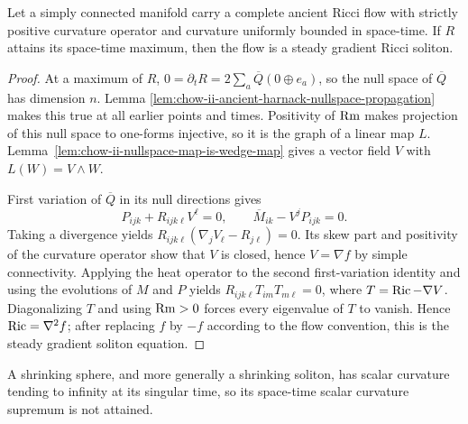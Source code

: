 \begin{theorem}
\label{thm:chow-ii-ancient-positive-curvature-maximizer-steady-soliton}


Let a simply connected manifold carry a complete ancient Ricci flow with
strictly positive curvature operator and curvature uniformly bounded in
space-time.  If \(R\) attains its space-time maximum, then the flow is a
steady gradient Ricci soliton.
\end{theorem}
\begin{proof}
\sketch At a maximum of \(R\),
\(0=\partial_tR=2\sum_a\overline Q(0\oplus e_a)\), so the null space of
\(\overline Q\) has dimension \(n\).  Lemma
\ref{lem:chow-ii-ancient-harnack-nullspace-propagation} makes this true at all
earlier points and times.  Positivity of \(\operatorname{Rm}\) makes projection of this null
space to one-forms injective, so it is the graph of a linear map \(L\).
Lemma~\ref{lem:chow-ii-nullspace-map-is-wedge-map} gives a vector field \(V\)
with \(L(W)=V\wedge W\).

First variation of \(\overline Q\) in its null directions gives
\[
P_{ijk}+R_{ijk\ell}V^\ell=0,
\qquad \overline M_{ik}-V^jP_{ijk}=0.
\]
Taking a divergence yields
\(R_{ijk\ell}(\nabla_jV_\ell-R_{j\ell})=0\).  Its skew part and positivity
of the curvature operator show that \(V\) is closed, hence \(V=\nabla f\) by
simple connectivity.  Applying the heat operator to the second first-variation
identity and using the evolutions of \(M\) and \(P\) yields
\(R_{ijk\ell}T_{im}T_{m\ell}=0\), where
\(T=\operatorname{Ric}-\nabla V\).  Diagonalizing \(T\) and using \(\operatorname{Rm}>0\) forces every
eigenvalue of \(T\) to vanish.  Hence \(\operatorname{Ric}=\nabla^2f\); after replacing
\(f\) by \(-f\) according to the flow convention, this is the steady gradient
soliton equation.
\end{proof}

\begin{remark}
\label{rem:chow-ii-shrinking-soliton-no-spacetime-r-maximum}

A shrinking sphere, and more generally a shrinking soliton, has scalar
curvature tending to infinity at its singular time, so its space-time scalar
curvature supremum is not attained.
\end{remark}

